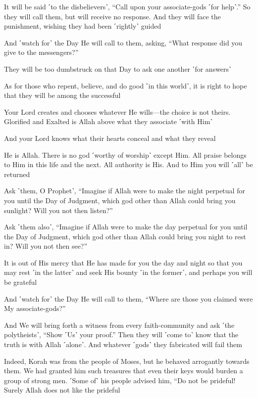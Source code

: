 It will be said ˹to the disbelievers˺, “Call upon your associate-gods ˹for help˺.” So they will call them, but will receive no response. And they will face the punishment, wishing they had been ˹rightly˺ guided

And ˹watch for˺ the Day He will call to them, asking, “What response did you give to the messengers?”

They will be too dumbstruck on that Day to ask one another ˹for answers˺

As for those who repent, believe, and do good ˹in this world˺, it is right to hope that they will be among the successful

Your Lord creates and chooses whatever He wills—the choice is not theirs. Glorified and Exalted is Allah above what they associate ˹with Him˺

And your Lord knows what their hearts conceal and what they reveal

He is Allah. There is no god ˹worthy of worship˺ except Him. All praise belongs to Him in this life and the next. All authority is His. And to Him you will ˹all˺ be returned

Ask ˹them, O Prophet˺, “Imagine if Allah were to make the night perpetual for you until the Day of Judgment, which god other than Allah could bring you sunlight? Will you not then listen?”

Ask ˹them also˺, “Imagine if Allah were to make the day perpetual for you until the Day of Judgment, which god other than Allah could bring you night to rest in? Will you not then see?”

It is out of His mercy that He has made for you the day and night so that you may rest ˹in the latter˺ and seek His bounty ˹in the former˺, and perhaps you will be grateful

And ˹watch for˺ the Day He will call to them, “Where are those you claimed were My associate-gods?”

And We will bring forth a witness from every faith-community and ask ˹the polytheists˺, “Show ˹Us˺ your proof.” Then they will ˹come to˺ know that the truth is with Allah ˹alone˺. And whatever ˹gods˺ they fabricated will fail them

Indeed, Korah was from the people of Moses, but he behaved arrogantly towards them. We had granted him such treasures that even their keys would burden a group of strong men. ˹Some of˺ his people advised him, “Do not be prideful! Surely Allah does not like the prideful

